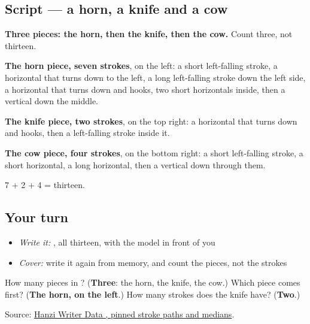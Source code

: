 \subsection*{Script — a horn, a knife and a cow}

\begin{quote}
\end{quote}

\textbf{Three pieces: the horn, then the knife, then the cow.} Count three, not thirteen.

\textbf{The horn piece, seven strokes}, on the left: a short left-falling stroke, a horizontal that turns down to the left, a long left-falling stroke down the left side, a horizontal that turns down and hooks, two short horizontals inside, then a vertical down the middle.

\textbf{The knife piece, two strokes}, on the top right: a horizontal that turns down and hooks, then a left-falling stroke inside it.

\textbf{The cow piece, four strokes}, on the bottom right: a short left-falling stroke, a short horizontal, a long horizontal, then a vertical down through them.

7 + 2 + 4 = thirteen.

\subsection*{Your turn}
\begin{itemize}
\raggedright
  \item \emph{Write it:} , all thirteen, with the model in front of you
  \item \emph{Cover:} write it again from memory, and count the pieces, not the strokes
\end{itemize}

\begin{tcolorbox}[breakable,colback=teal!4,colframe=teal!35!black,title={Before you move on}]
How many pieces in ? (\textbf{Three}: the horn, the knife, the cow.) Which piece comes first? (\textbf{The horn, on the left}.) How many strokes does the knife have? (\textbf{Two}.)

Source: \href{https://raw.githubusercontent.com/chanind/hanzi-writer-data/68d10a4b21150cae5e1ebbd223eed289cf32d90c/data/\%E8\%A7\%A3.json}{Hanzi Writer Data , pinned stroke paths and medians}.
\end{tcolorbox}
